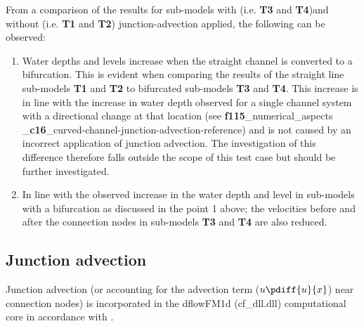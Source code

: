 From a comparison of the results for sub-models with (i.e. \textbf{\textcolor[rgb]{1,0,0}{T3}} and \textbf{\textcolor[rgb]{1,0,0}{T4}})and without (i.e. \textbf{\textcolor[rgb]{1,0,0}{T1}} and \textbf{\textcolor[rgb]{1,0,0}{T2}}) junction-advection applied, the following can be observed:

\begin{enumerate}
		
		\item Water depths and levels increase when the straight channel is converted to a bifurcation. This is evident when comparing the results of the straight line sub-models \textbf{\textcolor[rgb]{1,0,0}{T1}} and \textbf{\textcolor[rgb]{1,0,0}{T2}} to bifurcated sub-models \textbf{\textcolor[rgb]{1,0,0}{T3}} and \textbf{\textcolor[rgb]{1,0,0}{T4}}. This increase is in line with the increase in water depth observed for a single channel system with a directional change at that location (see \textbf{f115}\_numerical\_aspects     \_\textbf{c16}\_curved-channel-junction-advection-reference) and is not caused by an incorrect application of junction advection. The investigation of this difference therefore falls outside the scope of this test case but should be further investigated. \newline

	\item In line with the observed increase in the water depth and level in sub-models with a bifurcation as discussed in the point 1 above; the velocities before and after the connection nodes in sub-models \textbf{\textcolor[rgb]{1,0,0}{T3}} and \textbf{\textcolor[rgb]{1,0,0}{T4}} are also reduced. \newline
	
\end{enumerate}

\subsection{Junction advection} \label{10404:description of junction advection}
Junction advection (or accounting for the advection term ($u \pdiff{u}{x}$) near connection nodes) is incorporated in the dflowFM1d (cf\_dll.dll) computational core in accordance with \citet{Borsboom2017}.

